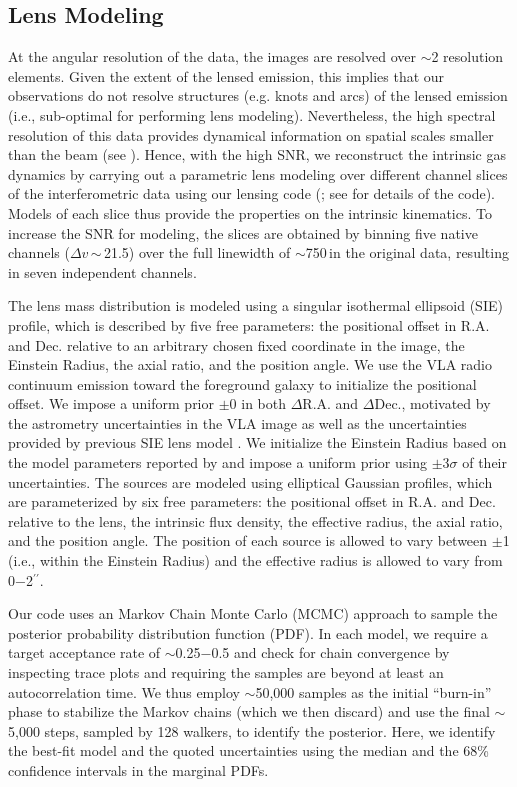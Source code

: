 \documentclass[]{emulateapj}
\begin{document}
\subsection{Lens Modeling} \label{sec:lensmodel}
At the angular resolution of the \bco data, the images are resolved over
$\sim$2 resolution elements. Given the extent of the lensed emission,
this implies that our \bco observations do not resolve
structures (e.g. knots and arcs) of the lensed emission
(i.e., sub-optimal for
performing lens modeling). Nevertheless, the high spectral
resolution of this data provides dynamical information on
spatial scales smaller than the beam (see ).
Hence, with the high SNR, we reconstruct the intrinsic gas
dynamics by carrying out a parametric lens modeling over different
channel slices of the interferometric data using our lensing code
\uvmcmcfit
(\citealt{uvmcmcfit15a}; see \citealt{Bussmann15a} for details of the code).
Models of each slice thus provide the
properties on the intrinsic kinematics. To increase the SNR for modeling, the
slices are obtained by binning five native channels
($\Delta v$\,$\sim$\,21.5\kms) over the full
linewidth of $\sim$750\,\kms in the original data, resulting in seven
independent channels.

The lens mass distribution is modeled using a singular isothermal
ellipsoid (SIE) profile, which is described by five free parameters: the
positional offset in R.A. and Dec. relative to an arbitrary chosen
fixed coordinate in the image, the Einstein Radius, the axial ratio, and the
position angle. We use the VLA radio continuum emission toward
the foreground galaxy to initialize the positional offset. We impose a
uniform prior $\pm$0 in both $\Delta$R.A. and $\Delta$Dec.,
motivated by the astrometry uncertainties in the VLA image as well as
the uncertainties provided by previous SIE lens model .
We initialize the Einstein Radius based on the model parameters reported by 
and impose a uniform prior using $\pm$3$\sigma$ of their uncertainties.
The sources are modeled using elliptical Gaussian profiles, which are
parameterized by six free parameters: the positional offset in R.A.
and Dec. relative to the lens, the intrinsic flux density, the effective
radius, the axial ratio, and the position angle. The position of each source
is allowed to vary between $\pm$1 (i.e., within the Einstein Radius)
and the effective radius is allowed to vary from 0$-$2$^{\prime\prime}$.

Our code uses an Markov Chain Monte Carlo (MCMC) approach to sample the
posterior probability distribution function (PDF).
In each model, we require a target acceptance rate of $\sim$0.25$-$0.5
and check for chain convergence by inspecting trace plots
and requiring the samples are beyond at least an autocorrelation time.
We thus employ $\sim$50,000 samples as the initial ``burn-in'' phase
to stabilize the Markov chains (which we then discard) and
use the final $\sim$5,000 steps, sampled by 128 walkers, to identify
the posterior. Here, we
identify the best-fit model and the quoted uncertainties using the
median and the 68\% confidence intervals in the marginal PDFs.

\end{document}
